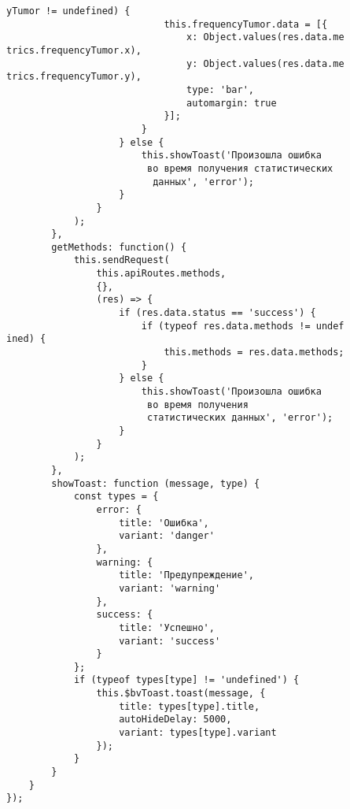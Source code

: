 \begin{verbatim}
yTumor != undefined) {
                            this.frequencyTumor.data = [{
                                x: Object.values(res.data.me
trics.frequencyTumor.x),
                                y: Object.values(res.data.me
trics.frequencyTumor.y),
                                type: 'bar',
                                automargin: true
                            }];
                        }
                    } else {
                        this.showToast('Произошла ошибка
                         во время получения статистических
                          данных', 'error');
                    }
                }
            );
        },
        getMethods: function() {
            this.sendRequest(
                this.apiRoutes.methods,
                {},
                (res) => {
                    if (res.data.status == 'success') {
                        if (typeof res.data.methods != undef
ined) {
                            this.methods = res.data.methods;
                        }
                    } else {
                        this.showToast('Произошла ошибка
                         во время получения 
                         статистических данных', 'error');
                    }
                }
            );
        },
        showToast: function (message, type) {
            const types = {
                error: {
                    title: 'Ошибка',
                    variant: 'danger'
                },
                warning: {
                    title: 'Предупреждение',
                    variant: 'warning'
                },
                success: {
                    title: 'Успешно',
                    variant: 'success'
                }
            };
            if (typeof types[type] != 'undefined') {
                this.$bvToast.toast(message, {
                    title: types[type].title,
                    autoHideDelay: 5000,
                    variant: types[type].variant
                });
            }
        }
    }
});
\end{verbatim}
\vspace{8mm}
\Large
